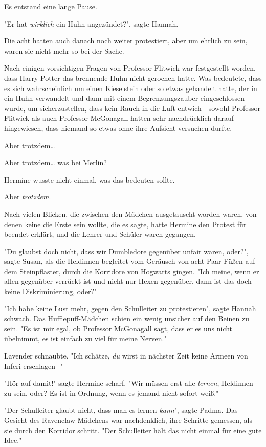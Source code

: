 {Es entstand eine lange Pause.

"Er hat \emph{wirklich} ein Huhn angezündet?", sagte Hannah.

Die acht hatten auch danach noch weiter protestiert, aber um ehrlich zu sein, waren sie nicht mehr so bei der Sache.

Nach einigen vorsichtigen Fragen von Professor Flitwick war festgestellt worden, dass Harry Potter das brennende Huhn nicht gerochen hatte. Was bedeutete, dass es sich wahrscheinlich um einen Kieselstein oder so etwas gehandelt hatte, der in ein Huhn verwandelt und dann mit einem Begrenzungszauber eingeschlossen wurde, um sicherzustellen, dass kein Rauch in die Luft entwich - sowohl Professor Flitwick als auch Professor McGonagall hatten sehr nachdrücklich darauf hingewiesen, dass niemand so etwas ohne ihre Aufsicht versuchen durfte.

Aber trotzdem…

Aber trotzdem… was bei Merlin?

Hermine wusste nicht einmal, was das bedeuten sollte.

Aber \emph{trotzdem}.

Nach vielen Blicken, die zwischen den Mädchen ausgetauscht worden waren, von denen keine die Erste sein wollte, die es sagte, hatte Hermine den Protest für beendet erklärt, und die Lehrer und Schüler waren gegangen.

"Du glaubst doch nicht, dass wir Dumbledore gegenüber unfair waren, oder?", sagte Susan, als die Heldinnen begleitet vom Geräusch von acht Paar Füßen auf dem Steinpflaster, durch die Korridore von Hogwarts gingen. "Ich meine, wenn er allen gegenüber verrückt ist und nicht nur Hexen gegenüber, dann ist das doch keine Diskriminierung, oder?"

"Ich habe keine Lust mehr, gegen den Schulleiter zu protestieren", sagte Hannah schwach. Das Hufflepuff-Mädchen schien ein wenig unsicher auf den Beinen zu sein. "Es ist mir egal, ob Professor McGonagall sagt, dass er es uns nicht übelnimmt, es ist einfach zu viel für meine Nerven."

Lavender schnaubte. "Ich schätze, \emph{du} wirst in nächster Zeit keine Armeen von Inferi erschlagen -"

"Hör auf damit!" sagte Hermine scharf. "Wir müssen erst alle \emph{lernen}, Heldinnen zu sein, oder? Es ist in Ordnung, wenn es jemand nicht sofort weiß."

"Der Schulleiter glaubt nicht, dass man es lernen \emph{kann}", sagte Padma. Das Gesicht des Ravenclaw-Mädchens war nachdenklich, ihre Schritte gemessen, als sie durch den Korridor schritt. "Der Schulleiter hält das nicht einmal für eine gute Idee."

}
